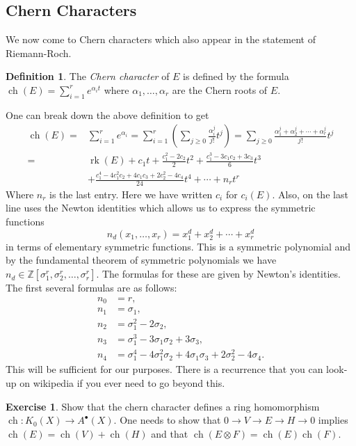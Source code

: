 \documentclass[12pt]{article}
\numberwithin{equation}{section}
\theoremstyle{definition}
\newtheorem{definition}[theorem]{Definition}
\newtheorem{exercise}[theorem]{Exercise}
\theoremstyle{remark}
\newcommand{\ZZ}{\mathbb{Z}}
\newcommand{\rk}{\operatorname{rk}}
\newcommand{\ch}{\operatorname{ch}}
\begin{document}
\subsection{Chern Characters}
We now come to Chern characters which also appear in the statement of Riemann-Roch.
\begin{definition}
	The \emph{Chern character} of $E$ is defined by the formula $\ch(E) = \sum_{i=1}^r e^{\alpha_i t}$
	where $\alpha_1,\ldots, \alpha_r$ are the Chern roots of $E$.
\end{definition}
One can break down the above definition to get 
\begin{align*}
\ch(E) =&\sum_{i=1}^r e^{\alpha_i}=\sum_{i=1}^r \left ( \sum_{j\geq 0}  \frac{\alpha_i^j}{j!}t^j \right) = \sum_{j\geq 0} \frac{\alpha_1^j + \alpha_2^j + \cdots + \alpha_r^j }{j!}t^j\\
=& \rk(E) + c_1t + \frac{c_1^2 - 2c_2 }{2}t^2 + \frac{c_1^3 - 3 c_1 c_2 + 3c_3}{6}t^3 \\
& + \frac{c_1^4 - 4c_1^2c_2 + 4 c_1c_3 + 2 c_2^2 - 4c_4}{24} t^4 + \cdots + n_r t^r
\end{align*}
Where $n_r$ is the last entry. 
Here we have written $c_i$ for $c_i(E)$. 
Also, on the last line uses the Newton identities which allows us to express the symmetric functions 
$$n_d(x_1,\ldots,x_r) = x_1^d+x_2^d+\cdots + x_r^d $$
in terms of elementary symmetric functions.
This is a symmetric polynomial and by the fundamental theorem of symmetric polynomials we have $n_d \in \ZZ[\sigma^r_1,\sigma^r_2,\ldots,\sigma^r_r]$.
The formulas for these are given by Newton's identities. 
The first several formulas are as follows:
\begin{align*}
n_0 &= r, \\
n_1 &= \sigma_1, \\
n_2 &= \sigma_1^2 - 2 \sigma_2,\\
n_3 &= \sigma_1^3 - 3 \sigma_1 \sigma_2 + 3 \sigma_3,\\
n_4 &= \sigma_1^4 - 4 \sigma_1^2 \sigma_2 + 4 \sigma_1 \sigma_3 + 2 \sigma_2^2 - 4 \sigma_4.
\end{align*}
This will be sufficient for our purposes.
There is a recurrence that you can look-up on wikipedia if you ever need to go beyond this. 
\begin{exercise}
	Show that the chern character defines a ring homomorphism $\ch: K_0(X) \to A^{\bullet}(X).$ One needs to show that $ 0 \to V \to E \to H \to 0$ implies $\ch(E) = \ch(V) + \ch(H)$ and that $ \ch(E \otimes F) = \ch(E)\ch(F)$.
\end{exercise}
\end{document}
